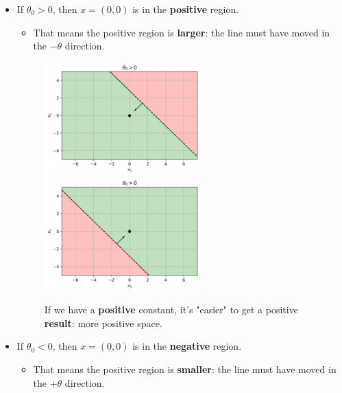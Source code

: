 \begin{itemize}
            \item If $\theta_0>0$, then $x=(0,0)$ is in the \textbf{positive} region.
                \begin{itemize}
                    \item That means the positive region is \textbf{larger}: the line must have moved in the $-\theta$ direction.
                \end{itemize}
                
                \begin{figure}[H]
                    \centering                         \includegraphics[width=60mm,scale=0.5]{images/classification_images/theta_0_greater_zero.png}
                    \includegraphics[width=60mm,scale=0.5]{images/classification_images/positive_theta0_positive_theta.png}
                        \caption*{If we have a \textbf{positive} constant, it's "easier" to get a positive \textbf{result}: more positive space.}
                \end{figure}
                
                
            \item If $\theta_0<0$, then $x=(0,0)$ is in the \textbf{negative} region.
                \begin{itemize}
                    \item That means the positive region is \textbf{smaller}: the line must have moved in the $+\theta$ direction.
                \end{itemize}
                

\end{itemize}
